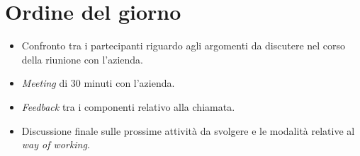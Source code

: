 \section{Ordine del giorno}
\begin{itemize}
    \item Confronto tra i partecipanti riguardo agli argomenti da discutere nel 
		corso della riunione con l'azienda.
    \item \textit{Meeting} di 30 minuti con l'azienda.
    \item \textit{Feedback} tra i componenti relativo alla chiamata.
    \item Discussione finale sulle prossime attività da svolgere e le modalità 
		relative al \textit{way of working}.
\end{itemize}
